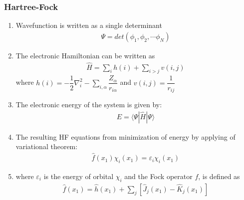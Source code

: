 \documentclass[slidestop,mathserif,compress,xcolor=svgnames]{beamer}
\begin{document}
\begin{frame}
\frametitle{\small Hartree-Fock}
\footnotesize{
\begin{enumerate}
\item Wavefunction is written as a single determinant
\begin{align*}
\Psi = det(\phi_1,\phi_2,\cdots\phi_N)
\end{align*}
\item The electronic Hamiltonian can be written as
\begin{align*}
\hat{H} = \sum_ih(i) + \sum_{i>j}v(i,j)
\end{align*}
where $\displaystyle{h(i) = -\dfrac{1}{2}\nabla^2_i - \sum_{i,\alpha}\dfrac{Z_\alpha}{r_{i\alpha}}}$ and $v(i,j) =\dfrac{1}{r_{ij}}$
\item The electronic energy of the system is given by:
\begin{align*}
E = \langle\Psi|\hat{H}|\Psi\rangle
\end{align*}
\item The resulting HF equations from minimization of energy by applying of variational theorem:
\begin{align*}
\hat{f}(x_1)\chi_i(x_1)= \varepsilon_i\chi_i(x_1)
\end{align*}
\item[] where $\varepsilon_i$ is the energy of orbital $\chi_i$ and the Fock operator $f$, is defined as
\begin{align*}
\hat{f}(x_1) = \hat{h}(x_1) + \sum_j\left[\hat{J}_j(x_1)-\hat{K}_j(x_1)\right]
\end{align*}
\end{enumerate}
}
\end{frame}
\end{document}
